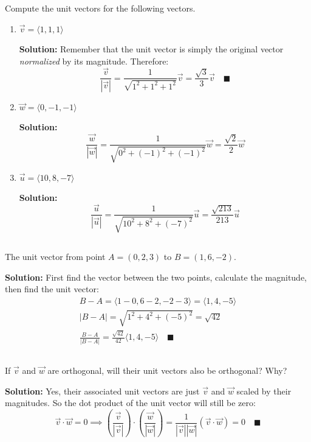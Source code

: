 \documentclass[letterpaper, 10pt]{article}
\begin{document}
\subsection{} Compute the unit vectors for the following vectors.
\begin{enumerate}[label=(\alph*)]
\item $\vec v = \langle 1,1,1 \rangle$
\par \textbf{Solution:} Remember that the unit vector is simply the original vector \textit{normalized} by its magnitude. Therefore:
\[ \frac{\vec v}{|\vec v|} = \frac{1}{\sqrt{1^2 + 1^2 + 1^2}} \vec v = \frac{\sqrt{3}}{3} \vec v \quad\blacksquare \]

\item $\vec w = \langle 0,-1,-1 \rangle$
\par \textbf{Solution:} 
\[ \frac{ \vec w}{|\vec w|} = \frac{1}{\sqrt{ 0^2 + (-1)^2 + (-1)^2}} \vec w = \frac{\sqrt{2}}{2} \vec w \]

\item $\vec u = \langle 10,8,-7 \rangle$
\par \textbf{Solution:} 
\[ \frac{\vec u}{|\vec u|} = \frac{1}{\sqrt{10^2 + 8^2 + (-7)^2}} \vec u = \frac{\sqrt{213}}{213} \vec u \]

\end{enumerate}

\subsection{} The unit vector from point $A = (0,2,3)$ to $B = (1,6,-2)$.
\par \textbf{Solution:} First find the vector between the two points, calculate the magnitude, then find the unit vector:
\begin{gather*}
B - A = \langle 1 - 0, 6-2, -2-3 \rangle = \langle 1, 4, -5 \rangle \\
|B - A| = \sqrt{1^2 + 4^2 + (-5)^2} = \sqrt{42} \\
\frac{B - A}{|B - A|} = \frac{\sqrt{42}}{42}\langle 1, 4, -5 \rangle \quad\blacksquare
\end{gather*}

\subsection{} If $\vec v$ and $\vec w$ are orthogonal, will their unit vectors also be orthogonal? Why? 
\par \textbf{Solution:} Yes, their associated unit vectors are just $\vec v$ and $\vec w$ scaled by their magnitudes. So the dot product of the unit vector will still be zero:
\[ \vec v \cdot \vec w = 0 \implies \left( \frac{\vec v}{|\vec v|}  \right) \cdot \left( \frac{\vec w}{|\vec w|}  \right) = \frac{1}{|\vec v||\vec w|}(\vec v \cdot \vec w) = 0 \quad\blacksquare \]
\end{document}
